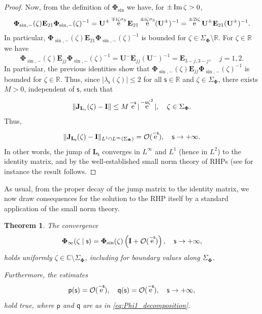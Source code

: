 \documentclass[reqno,a4paper,11pt]{amsart}
\DeclareMathOperator{\ee}{\rm e}
\renewcommand{\Im}{\mathop{\rm Im}}
\newcommand{\C}{\mathbb{C}}
\newcommand{\R}{\mathbb{R}}
\newcommand{\Boh}{\mathcal{O}}
\newcommand{\ii}{\mathrm{i}}
\renewcommand{\bm}{\mathbf}
\newcommand{\msf}{\mathsf}
\newcommand{\sad}{\msf s}
\newcommand{\uad}{\msf u}
\newtheorem{theorem}{Theorem}[section]
\theoremstyle{definition}
\theoremstyle{remark}
\numberwithin{equation}{section}
\begin{document}
\begin{proof}
    Now, from the definition of $\bm \Phi_{\sin}$ we have, for $\pm \Im \zeta > 0$,
    \[
        \begin{split}
        \bm \Phi_{\sin,-}(\zeta) \bm E_{21} \bm \Phi_{\sin,-}(\zeta)^{-1} 
            =  \bm U^\pm \ee^{\mp \ii \zeta \sigma_3} \bm E_{21} \ee^{\pm \ii \zeta \sigma_3} (\bm U^{\pm})^{-1} 
            = \ee^{\pm 2 \ii \zeta}  \bm U^\pm  \bm E_{21}  (\bm U^{\pm})^{-1} .
        \end{split}
    \]
    In particular, $\bm \Phi_{\sin,-}(\zeta) \bm E_{21} \bm \Phi_{\sin,-}(\zeta)^{-1} $ is bounded for $\zeta \in \Sigma_{\bm \Phi} \setminus \R$. For $\zeta \in \R$ we have
    \[
        \bm \Phi_{\sin,-}(\zeta) \bm E_{jj} \bm \Phi_{\sin,-}(\zeta)^{-1} 
            =  \bm U^-  \bm E_{jj}  (\bm U^{-})^{-1}
            =\bm E_{3-j,3-j}, \quad j=1,2.
    \]
     In particular, the previous identities show that $\bm \Phi_{\sin,-}(\zeta) \bm E_{jj} \bm \Phi_{\sin,-}(\zeta)^{-1}$ is bounded for $\zeta \in \R$. Thus, since $|\lambda_{\sad}(\zeta)| \leq 2$ for all $\sad \in \R$ and $\zeta  \in \Sigma_{\bm \Phi}$, there exists $M > 0$, independent of $\sad$, such that
    \begin{equation}\label{eq:estimateJs}
        \| \bm J_{ \bm L_s}(\zeta) - \bm I\| 
            \leq M \ee^{-\sad} |\ee^{- \uad \zeta ^2}|, \quad \zeta \in \Sigma_{\bm \Phi}.
    \end{equation}
    Thus,
    \[
        \| \bm J_{\bm L_{\sad}}(\zeta) - \bm I\|_{L^1  \cap L^\infty(\Sigma_{\bm \Phi})} 
        = \Boh(\ee^{- \sad}), 
        \quad \sad\to +\infty.
    \]
    In other words, the jump of $\bm L_\sad$ converges in $L^\infty$ and $L^1$ (hence in $L^2$) to the identity matrix, and by the well-established small norm theory of RHPs (see for instance \cite[Section~7.5]{deift_book} the result follows.
    \end{proof}

As usual, from the proper decay of the jump matrix to the identity matrix, we now draw consequences for the solution to the RHP itself by a standard application of the small norm theory.

    \begin{theorem}\label{thm:PhiInfinityConv}
    The convergence
        \[
        \bm \Phi_\infty(\zeta \mid \sad) = \bm \Phi_{\sin} (\zeta) \left(\bm I +  \Boh(\ee^{-\sad}) \right), \quad \sad \to +\infty,
    \]
    holds uniformly $\zeta \in \C \setminus \Sigma_{\bm \Phi}$, including for boundary values along $\Sigma_{\bm \Phi}$.

    Furthermore, the estimates
    \begin{equation}\label{eq:estimates_pq}
        \msf p(\sad)= \Boh(\ee^{- \sad}),\quad 
        \msf q(\sad)= \Boh(\ee^{-\sad}), \quad 
        \sad \to +\infty,
    \end{equation}
    hold true, where $\msf p$ and $\msf q$ are as in \eqref{eq:Phi1_decomposition}. 
    
    \end{theorem}
\end{document}
